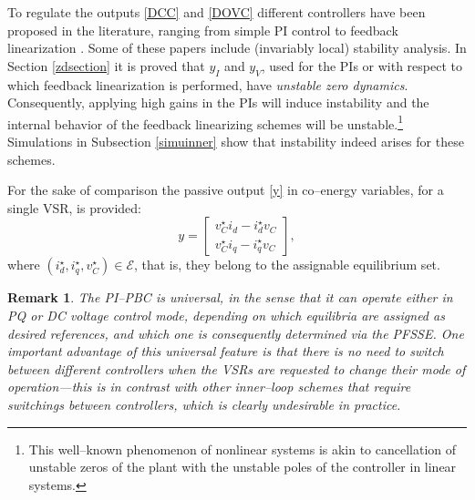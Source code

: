 \documentclass[5p,twocolumn]{elsarticle}
\def\lef[{\left[\begin{array}}
\def\rig]{\end{array}\right]}
\def\begrem{\begin{remark}\rm}
\def\endrem{\end{remark}}
\newtheorem{remark}[theorem]{Remark}
\numberwithin{equation}{section}
\begin{document}
To regulate the outputs \eqref{DCC} and \eqref{DOVC} different controllers have been proposed in the literature, ranging from simple PI control \cite{lee,pinto} to feedback linearization
\cite{chen1,chen2,bencha}. Some of these papers include (invariably local) stability analysis. In Section \ref{zdsection} it is proved that $y_I$  and $y_V$, used for the PIs or with respect to
which feedback linearization is performed, have {\em unstable zero dynamics}. Consequently, applying high gains in the PIs will induce instability and the internal behavior of the feedback linearizing schemes
will be unstable.\footnote{This well--known phenomenon of nonlinear systems \cite{isidori} is akin to cancellation of unstable zeros of the plant with the unstable poles of the controller in linear
systems.} Simulations in Subsection \ref{simuinner} show that instability indeed arises for these schemes.

For the sake of comparison the passive output \eqref{y} in co--energy variables, for a single VSR, is provided:
\begin{equation}\label{yy}
y=\lef[{c} v^\star _{C}i_{d}-i^\star _{d}v_{C} \\ v^\star _{C}i_{q}-i^\star _{q}v_{C} \rig],
\end{equation}
where $(i^\star _{d},i^\star _{q},v^\star _{C}) \in {\mathcal{E}}$, that is, they belong to the assignable equilibrium set.

\begrem\label{universal}
The PI--PBC is \textit{universal}, in the sense that it can operate either in \textit{PQ} or \textit{DC voltage control mode}, depending on which equilibria are assigned as desired references, and which one is consequently determined via the PFSSE. One important advantage of this universal feature is that there is {\em no need to switch} between different controllers when the VSRs are requested to change their mode of operation---this is in contrast with other inner--loop schemes that require switchings between controllers, which is clearly undesirable in practice.
\endrem
\end{document}
